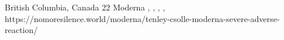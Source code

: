           {British Columbia, Canada}
          {22}
          {Moderna}
          {}
          {
            ,
            ,
            ,
            ,
          }
          {https://nomoresilence.world/moderna/tenley-csolle-moderna-severe-adverse-reaction/}



